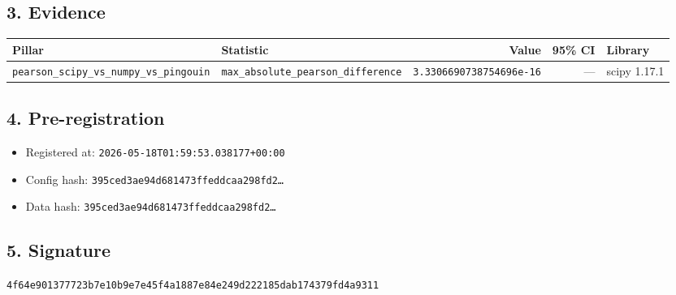 \documentclass{article}
\begin{document}
\subsection*{3. Evidence}
\begin{tabular}{llrrl}\toprule
\textbf{Pillar} & \textbf{Statistic} & \textbf{Value} & \textbf{95\% CI} & \textbf{Library} \\\midrule
\texttt{pearson\_scipy\_vs\_numpy\_vs\_pingouin} & \texttt{max\_absolute\_pearson\_difference} & \texttt{3.3306690738754696e-16} & --- & scipy 1.17.1 \\
\bottomrule\end{tabular}
\subsection*{4. Pre-registration}
\begin{itemize}
\item Registered at: \texttt{2026-05-18T01:59:53.038177+00:00}
\item Config hash: \texttt{395ced3ae94d681473ffeddcaa298fd2\dots}
\item Data hash: \texttt{395ced3ae94d681473ffeddcaa298fd2\dots}
\end{itemize}
\subsection*{5. Signature}
\texttt{4f64e901377723b7e10b9e7e45f4a1887e84e249d222185dab174379fd4a9311}\\
\end{document}

